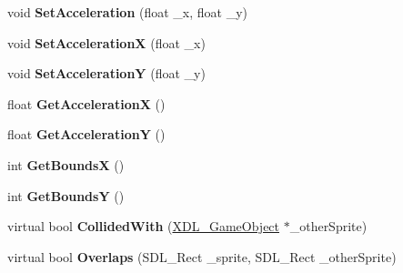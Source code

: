 \begin{DoxyCompactItemize}
\item 
\hypertarget{class_x_d_l___game_object_afe3853c83d9b579c29f214ee8f4e973f}{void {\bfseries Set\-Acceleration} (float \-\_\-x, float \-\_\-y)}\label{class_x_d_l___game_object_afe3853c83d9b579c29f214ee8f4e973f}

\item 
\hypertarget{class_x_d_l___game_object_a976621b77d2cd4423bd49588c747a495}{void {\bfseries Set\-Acceleration\-X} (float \-\_\-x)}\label{class_x_d_l___game_object_a976621b77d2cd4423bd49588c747a495}

\item 
\hypertarget{class_x_d_l___game_object_a4eea42378b77c6759b2a9cac4be935f1}{void {\bfseries Set\-Acceleration\-Y} (float \-\_\-y)}\label{class_x_d_l___game_object_a4eea42378b77c6759b2a9cac4be935f1}

\item 
\hypertarget{class_x_d_l___game_object_ace837b938efee5fc0296cdb80b00a683}{float {\bfseries Get\-Acceleration\-X} ()}\label{class_x_d_l___game_object_ace837b938efee5fc0296cdb80b00a683}

\item 
\hypertarget{class_x_d_l___game_object_adfb53693039eaf0f40f61f2679e0c0dd}{float {\bfseries Get\-Acceleration\-Y} ()}\label{class_x_d_l___game_object_adfb53693039eaf0f40f61f2679e0c0dd}

\item 
\hypertarget{class_x_d_l___game_object_a20b8f98a6f5f353b573db1a812088541}{int {\bfseries Get\-Bounds\-X} ()}\label{class_x_d_l___game_object_a20b8f98a6f5f353b573db1a812088541}

\item 
\hypertarget{class_x_d_l___game_object_ad65bdf30e324adc5a4fe03988b787094}{int {\bfseries Get\-Bounds\-Y} ()}\label{class_x_d_l___game_object_ad65bdf30e324adc5a4fe03988b787094}

\item 
\hypertarget{class_x_d_l___game_object_a663d0ad6f06b2341285bc9c63f9ee2dd}{virtual bool {\bfseries Collided\-With} (\hyperlink{class_x_d_l___game_object}{X\-D\-L\-\_\-\-Game\-Object} $\ast$\-\_\-other\-Sprite)}\label{class_x_d_l___game_object_a663d0ad6f06b2341285bc9c63f9ee2dd}

\item 
\hypertarget{class_x_d_l___game_object_a214f85c39378a9c77d6d5cd703718ee4}{virtual bool {\bfseries Overlaps} (S\-D\-L\-\_\-\-Rect \-\_\-sprite, S\-D\-L\-\_\-\-Rect \-\_\-other\-Sprite)}\label{class_x_d_l___game_object_a214f85c39378a9c77d6d5cd703718ee4}


\end{DoxyCompactItemize}
